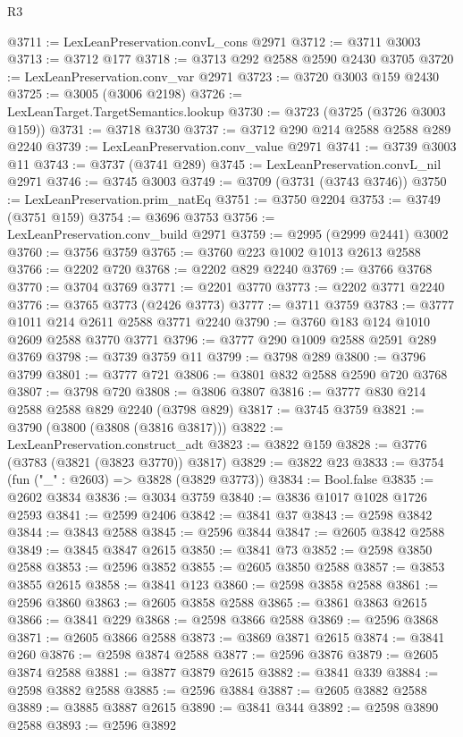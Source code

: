 \begin{lexlean}{R3}
\begin{coremodule}
@3711 := LexLeanPreservation.convL_cons @2971
@3712 := @3711 @3003
@3713 := @3712 @177
@3718 := @3713 @292 @2588 @2590 @2430 @3705
@3720 := LexLeanPreservation.conv_var @2971
@3723 := @3720 @3003 @159 @2430
@3725 := @3005 (@3006 @2198)
@3726 := LexLeanTarget.TargetSemantics.lookup
@3730 := @3723 (@3725 (@3726 @3003 @159))
@3731 := @3718 @3730
@3737 := @3712 @290 @214 @2588 @2588 @289 @2240
@3739 := LexLeanPreservation.conv_value @2971
@3741 := @3739 @3003 @11
@3743 := @3737 (@3741 @289)
@3745 := LexLeanPreservation.convL_nil @2971
@3746 := @3745 @3003
@3749 := @3709 (@3731 (@3743 @3746))
@3750 := LexLeanPreservation.prim_natEq
@3751 := @3750 @2204
@3753 := @3749 (@3751 @159)
@3754 := @3696 @3753
@3756 := LexLeanPreservation.conv_build @2971
@3759 := @2995 (@2999 @2441) @3002
@3760 := @3756 @3759
@3765 := @3760 @223 @1002 @1013 @2613 @2588
@3766 := @2202 @720
@3768 := @2202 @829 @2240
@3769 := @3766 @3768
@3770 := @3704 @3769
@3771 := @2201 @3770
@3773 := @2202 @3771 @2240
@3776 := @3765 @3773 (@2426 @3773)
@3777 := @3711 @3759
@3783 := @3777 @1011 @214 @2611 @2588 @3771 @2240
@3790 := @3760 @183 @124 @1010 @2609 @2588 @3770 @3771
@3796 := @3777 @290 @1009 @2588 @2591 @289 @3769
@3798 := @3739 @3759 @11
@3799 := @3798 @289
@3800 := @3796 @3799
@3801 := @3777 @721
@3806 := @3801 @832 @2588 @2590 @720 @3768
@3807 := @3798 @720
@3808 := @3806 @3807
@3816 := @3777 @830 @214 @2588 @2588 @829 @2240 (@3798 @829)
@3817 := @3745 @3759
@3821 := @3790 (@3800 (@3808 (@3816 @3817)))
@3822 := LexLeanPreservation.construct_adt
@3823 := @3822 @159
@3828 := @3776 (@3783 (@3821 (@3823 @3770)) @3817)
@3829 := @3822 @23
@3833 := @3754 (fun ("_" : @2603) => @3828 (@3829 @3773))
@3834 := Bool.false
@3835 := @2602 @3834
@3836 := @3034 @3759
@3840 := @3836 @1017 @1028 @1726 @2593
@3841 := @2599 @2406
@3842 := @3841 @37
@3843 := @2598 @3842
@3844 := @3843 @2588
@3845 := @2596 @3844
@3847 := @2605 @3842 @2588
@3849 := @3845 @3847 @2615
@3850 := @3841 @73
@3852 := @2598 @3850 @2588
@3853 := @2596 @3852
@3855 := @2605 @3850 @2588
@3857 := @3853 @3855 @2615
@3858 := @3841 @123
@3860 := @2598 @3858 @2588
@3861 := @2596 @3860
@3863 := @2605 @3858 @2588
@3865 := @3861 @3863 @2615
@3866 := @3841 @229
@3868 := @2598 @3866 @2588
@3869 := @2596 @3868
@3871 := @2605 @3866 @2588
@3873 := @3869 @3871 @2615
@3874 := @3841 @260
@3876 := @2598 @3874 @2588
@3877 := @2596 @3876
@3879 := @2605 @3874 @2588
@3881 := @3877 @3879 @2615
@3882 := @3841 @339
@3884 := @2598 @3882 @2588
@3885 := @2596 @3884
@3887 := @2605 @3882 @2588
@3889 := @3885 @3887 @2615
@3890 := @3841 @344
@3892 := @2598 @3890 @2588
@3893 := @2596 @3892

\end{coremodule}
\end{lexlean}

